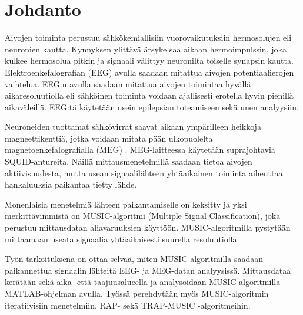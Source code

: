 \section{Johdanto}
Aivojen toiminta perustuu sähkökemiallisiin vuorovaikutuksiin hermosolujen eli neuronien kautta. Kynnyksen ylittävä ärsyke saa aikaan hermoimpulssin, joka kulkee hermosolua pitkin ja signaali välittyy neuronilta toiselle synapsin kautta.\cite{} 
Elektroenkefalografian (EEG) avulla saadaan mitattua aivojen potentiaalierojen vaihtelua. EEG:n avulla saadaan mitattua aivojen toimintaa hyvällä aikaresoluutiolla eli sähköinen toiminta voidaan ajallisesti erotella hyvin pienillä aikaväleillä. EEG:tä käytetään usein epilepsian toteamiseen sekä unen analyysiin. \cite{Nunez2006ElectricBrain}

\tab Neuroneiden tuottamat sähkövirrat saavat aikaan ympärilleen heikkoja magneettikenttiä, jotka voidaan mitata pään ulkopuolelta magnetoenkefalografialla (MEG) \cite{Hamalainen1993MagnetoencephalographytheoryBrain}. MEG-laitteessa käytetään suprajohtavia SQUID-antureita. 
Näillä mittausmenetelmillä saadaan tietoa aivojen aktiivisuudesta, mutta usean signaalilähteen yhtäaikainen toiminta aiheuttaa hankaluuksia paikantaa tietty lähde. 

\tab Monenlaisia menetelmiä lähteen paikantamiselle on keksitty ja yksi merkittävimmistä on MUSIC-algoritmi (Multiple Signal Classification), joka perustuu mittausdatan aliavaruuksien käyttöön. MUSIC-algoritmilla pystytään mittaamaan useata signaalia yhtäaikaisesti suurella resoluutiolla. \cite{Mosher1999SourceMUSIC}

\tab Työn tarkoituksena on ottaa selvää, miten MUSIC-algoritmilla saadaan paikannettua signaalin lähteitä EEG- ja MEG-datan analyysissä. Mittausdataa kerätään sekä aika- että taajuusalueella ja analysoidaan MUSIC-algoritmilla MATLAB-ohjelman avulla. Työssä perehdytään myös MUSIC-algoritmin iteratiivisiin menetelmiin, RAP- sekä TRAP-MUSIC -algoritmeihin.
